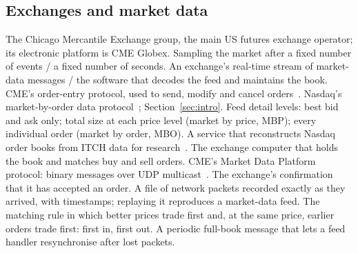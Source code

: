 \subsection{Exchanges and market data}
\begin{description}[leftmargin=1.2em,style=sameline,itemsep=1pt,font=\normalfont\bfseries]
 The Chicago Mercantile Exchange group, the main US futures exchange operator; its
  electronic platform is CME Globex.
 Sampling the market after a fixed number of events / a fixed number of seconds.
 An exchange's real-time stream of market-data messages / the software
  that decodes the feed and maintains the book.
 CME's order-entry protocol, used to send, modify and cancel orders~\citep{cme_ilink3}.
 Nasdaq's market-by-order data protocol~\citep{itch50}; Section~\ref{sec:intro}.
 Feed detail levels: best bid and ask only; total size at each price level (market
  by price, MBP); every individual order (market by order, MBO).
 A service that reconstructs Nasdaq order books from ITCH data for
  research~\citep{lobster}.
 The exchange computer that holds the book and matches buy and sell orders.
 CME's Market Data Platform protocol: binary messages over UDP
  multicast~\citep{cme_mdp3}.
 The exchange's confirmation that it has accepted an order.
 A file of network packets recorded exactly as they arrived, with timestamps; replaying
  it reproduces a market-data feed.
 The matching rule in which better prices trade first and, at the same price, earlier
  orders trade first: first in, first out.
 A periodic full-book message that lets a feed handler resynchronise after
  lost packets.
\end{description}

